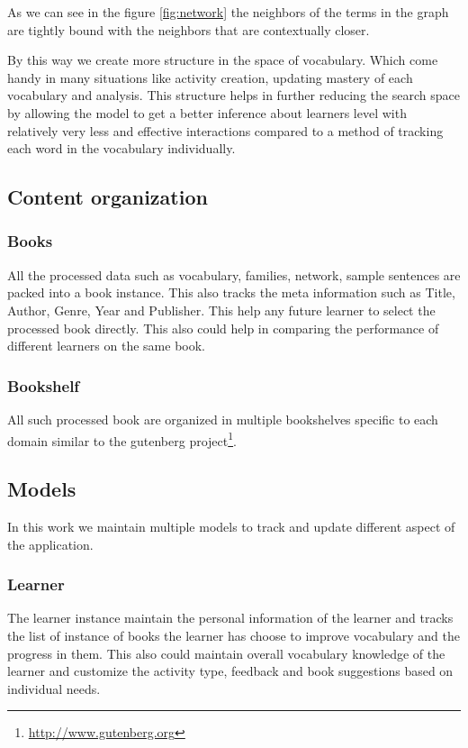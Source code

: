\documentclass[11pt,a4paper]{article}
\begin{document}
As we can see in the figure \ref{fig:network} the neighbors of the terms in the
graph are tightly bound with the neighbors that are contextually closer.

By this way we create more structure in the space of vocabulary. Which come
handy in many situations like activity creation, updating mastery of each
vocabulary and analysis. This structure helps in further reducing the search space
by allowing the model to get a better inference about learners level with
relatively very less and effective interactions compared to a method of
tracking each word in the vocabulary individually.


\subsection{Content organization}

\subsubsection{Books}
All the processed data such as vocabulary, families, network, sample sentences
are packed into a book instance. This also tracks the meta information such as
Title, Author, Genre, Year and Publisher. This help any future learner to select
the processed book directly. This also could help in comparing the performance
of different learners on the same book.

\subsubsection{Bookshelf}
All such processed book are organized in multiple bookshelves specific to each
domain similar to the gutenberg project\footnote{\url{http://www.gutenberg.org}}.

\subsection{Models}
In this work we maintain multiple models to track and update different aspect
of the application.

\subsubsection{Learner}
The learner instance maintain the personal information of the learner and tracks
the list of instance of books the learner has choose to improve vocabulary and the
progress in them. This also could maintain overall vocabulary knowledge of
the learner and customize the activity type, feedback and book suggestions based
on individual needs.
\end{document}
